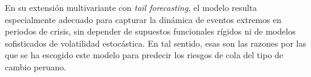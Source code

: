 ﻿\documentclass[11pt,a4paper]{article}
\newcommand{\todo}[1]{\textcolor{red}{[TODO: #1]}}
\begin{document}
En su extensión multivariante con \textit{tail forecasting}, el modelo resulta especialmente adecuado para capturar la dinámica de eventos extremos en periodos de crisis, sin depender de supuestos funcionales rígidos ni de modelos sofisticados de volatilidad estocástica. En tal sentido, esas son las razones por las que se ha escogido este modelo para predecir los riesgos de cola del tipo de cambio peruano.







\end{document}

